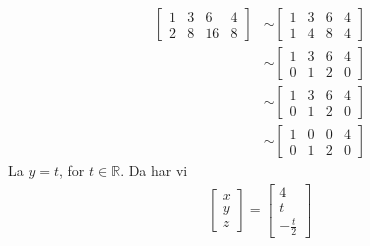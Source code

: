 \documentclass[11pt, a4paper, norsk]{NTNUoving}
\begin{document}
\begin{oppgave}
    \begin{punkt}
        \begin{align*}
        \begin{bmatrix} %
            1 & 3 & 6 & 4\\
            2 & 8 & 16 & 8
        \end{bmatrix}
           &\sim
        \begin{bmatrix} %
            1 & 3 & 6 & 4\\
            1 & 4 & 8 & 4
        \end{bmatrix}
           \\&\sim
        \begin{bmatrix} %
            1 & 3 & 6 & 4\\
            0 & 1 & 2 & 0
        \end{bmatrix}
           \\&\sim
        \begin{bmatrix} %
            1 & 3 & 6 & 4\\
            0 & 1 & 2 & 0
        \end{bmatrix}
           \\&\sim
        \begin{bmatrix} %
            1 & 0 & 0 & 4\\
            0 & 1 & 2 & 0
        \end{bmatrix}
        \end{align*}
        La $y=t$, for $t \in \mathbb{R} $. Da har vi
        \begin{align*}
        \begin{bmatrix} %
            x\\
            y\\
            z
        \end{bmatrix}
        =
        \begin{bmatrix} %
            4\\
            t\\
            -\frac{t}{2}
        \end{bmatrix}
        \end{align*}
    \end{punkt}
    

\end{oppgave}
\end{document}
